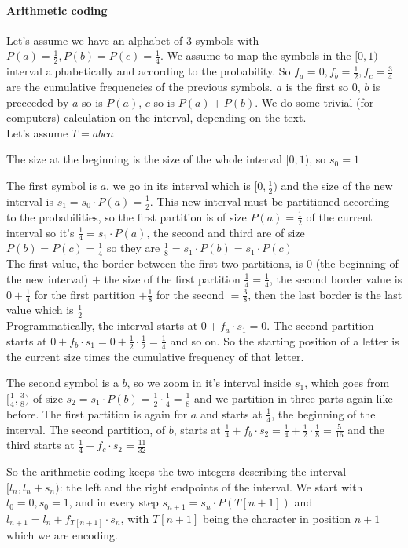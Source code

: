 \documentclass[10pt]{report}
\begin{document}
\paragraph{Arithmetic coding} Let's assume we have an alphabet of 3 symbols with $P(a) = \frac{1}{2}, P(b) = P(c) = \frac{1}{4}$. We assume to map the symbols in the $[0,1)$ interval alphabetically and according to the probability. So $f_a = 0, f_b = \frac{1}{2}, f_c = \frac{3}{4}$ are the cumulative frequencies of the previous symbols. $a$ is the first so $0$, $b$ is preceeded by $a$ so is $P(a)$, $c$ so is $P(a)+P(b)$. We do some trivial (for computers) calculation on the interval, depending on the text.\\
Let's assume $T = abca$\begin{list}{}{}
	\item The size at the beginning is the size of the whole interval $[0,1)$, so $s_0 = 1$
	\item The first symbol is $a$, we go in its interval which is $[0,\frac{1}{2})$ and the size of the new interval is $s_1 = s_0\cdot P(a) = \frac{1}{2}$. This new interval must be partitioned according to the probabilities, so the first partition is of size $P(a)=\frac{1}{2}$ of the current interval so it's $\frac{1}{4}=s_1\cdot P(a)$, the second and third are of size $P(b)=P(c)=\frac{1}{4}$ so they are $\frac{1}{8} = s_1\cdot P(b) = s_1\cdot P(c)$\\
	The first value, the border between the first two partitions, is $0$ (the beginning of the new interval) $+$ the size of the first partition $\frac{1}{4} = \frac{1}{4}$, the second border value is $0+\frac{1}{4}$ for the first partition $+\frac{1}{8}$ for the second $=\frac{3}{8}$, then the last border is the last value which is $\frac{1}{2}$\\
	Programmatically, the interval starts at $0+f_a\cdot s_1 = 0$. The second partition starts at $0+f_b\cdot s_1 = 0+\frac{1}{2}\cdot\frac{1}{2} = \frac{1}{4}$ and so on. So the starting position of a letter is the current size times the cumulative frequency of that letter.
	\item The second symbol is a $b$, so we zoom in it's interval inside $s_1$, which goes from $[\frac{1}{4},\frac{3}{8})$ of size $s_2 = s_1\cdot P(b) = \frac{1}{2}\cdot\frac{1}{4} = \frac{1}{8}$ and we partition in three parts again like before. The first partition is again for $a$ and starts at $\frac{1}{4}$, the beginning of the interval. The second partition, of $b$, starts at $\frac{1}{4}+f_b\cdot s_2 = \frac{1}{4}+\frac{1}{2}\cdot\frac{1}{8} = \frac{5}{16}$ and the third starts at $\frac{1}{4} + f_c\cdot s_2 = \frac{11}{32}$
\end{list}
So the arithmetic coding keeps the two integers describing the interval $[l_n, l_n+s_n)$: the left and the right endpoints of the interval. We start with $l_0 = 0, s_0 = 1$, and in every step $s_{n+1} = s_n\cdot P(T[n+1])$ and $l_{n+1} = l_n + f_{T[n+1]} \cdot s_n$, with $T[n+1]$ being the character in position $n+1$ which we are encoding.
\end{document}
